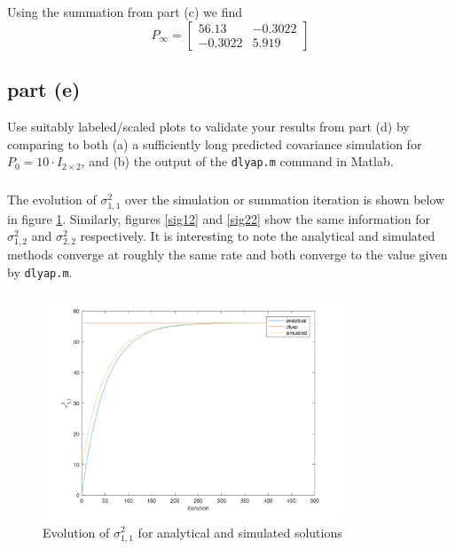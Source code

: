 \documentclass[11pt]{article}
\begin{document}
\subparagraph*{}
Using the summation from part (c) we find 
\begin{equation*}
	P_\infty = \begin{bmatrix} 56.13 & -0.3022 \\ -0.3022 & 5.919 \end{bmatrix}
\end{equation*}

\subsection*{part (e)}
Use suitably labeled/scaled plots to validate your results from part (d) by comparing to both (a) a sufficiently long predicted covariance simulation for $P_0=10\cdot I_{2\times 2}$, and (b) the output of the \texttt{dlyap.m} command in Matlab.

\subparagraph*{}
The evolution of $\sigma_{1,1}^2$ over the simulation or summation iteration is shown below in figure \ref{sig11}. Similarly, figures \ref{sig12} and \ref{sig22} show the same information for $\sigma_{1,2}^2$ and $\sigma_{2,2}^2$ respectively. It is interesting to note the analytical and simulated methods converge at roughly the same rate and both converge to the value given by \texttt{dlyap.m}.
\begin{figure}[h]
	\centering
	\includegraphics[width=0.8\textwidth]{prob4e_plt1.png}
	\caption{Evolution of $\sigma_{1,1}^2$ for analytical and simulated solutions}
	\label{sig11}
\end{figure}
\end{document}
